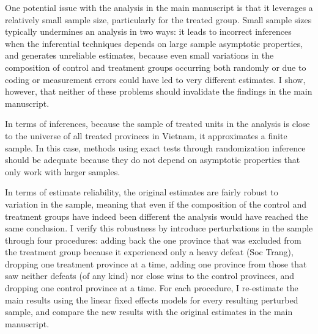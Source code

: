 \documentclass[12pt]{article}
\newcommand{\1}{\mathbbm{1}}
\begin{document}
One potential issue with the analysis in the main manuscript is that it leverages a relatively small sample size, particularly for the treated group. Small sample sizes typically undermines an analysis in two ways: it leads to incorrect inferences when the inferential techniques depends on large sample asymptotic properties, and generates unreliable estimates, because even small variations in the composition of control and treatment groups occurring both randomly or due to coding or measurement errors could have led to very different estimates. I show, however, that neither of these problems should invalidate the findings in the main manuscript.

In terms of inferences, because the sample of treated units in the analysis is close to the universe of all treated provinces in Vietnam, it approximates a finite sample. In this case, methods using exact tests through randomization inference should be adequate because they do not depend on asymptotic properties that only work with larger samples.

In terms of estimate reliability, the original estimates are fairly robust to variation in the sample, meaning that even if the composition of the control and treatment groups have indeed been different the analysis would have reached the same conclusion. I verify this robustness by introduce perturbations in the sample through four procedures: adding back the one province that was excluded from the treatment group because it experienced only a heavy defeat (Soc Trang), dropping one treatment province at a time, adding one province from those that saw neither defeats (of any kind) nor close wins to the control provinces, and dropping one control province at a time. For each procedure, I re-estimate the main results using the linear fixed effects models for every resulting perturbed sample, and compare the new results with the original estimates in the main manuscript.
\end{document}
